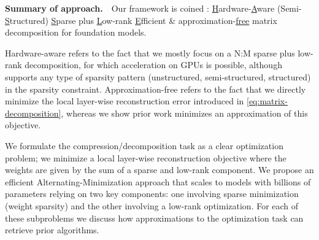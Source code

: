 
\textbf{Summary of approach.\,\,\,\,} Our framework is coined \ourframework: \underline{H}ardware-\underline{A}ware (Semi-\underline{S}tructured) \underline{S}parse plus \underline{L}ow-rank \underline{E}fficient \& approximation-\underline{free} matrix decomposition for foundation models.

Hardware-aware refers to the fact that we mostly focus on a N:M sparse \cite{zhou2021learning} plus low-rank decomposition, for which acceleration on GPUs is possible, although \ourframework supports any type of sparsity pattern (unstructured, semi-structured, structured) in the sparsity constraint. Approximation-free refers to the fact that we directly minimize the local layer-wise reconstruction error introduced in \cref{eq:matrix-decomposition}, whereas we show prior work minimizes an approximation of this objective.

We formulate the compression/decomposition task as a clear optimization problem; we minimize a local layer-wise reconstruction objective where the weights are given by the sum of a sparse and low-rank component. 
We propose an efficient Alternating-Minimization approach that scales to models with billions of parameters relying on 
two key components: one involving sparse minimization (weight sparsity) and the other involving a low-rank optimization. 
For each of these subproblems 
we discuss how approximations to the optimization task can retrieve prior algorithms.


